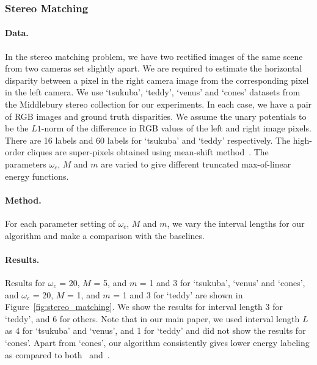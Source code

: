 \documentclass[10pt,letterpaper]{article}
\newcommand{\mysubsubsection}[1]{\vspace{0mm}\subsubsection{#1}\vspace{0mm}}
\newcommand{\myparagraph}[1]{\vspace{0mm}\paragraph{#1}}
\begin{document}
\clearpage

\mysubsubsection{Stereo Matching}

\myparagraph{\bf Data.} In the stereo matching problem, we have two rectified images of the same scene from two cameras set slightly apart. We are required to estimate the horizontal disparity between a pixel in the right camera image from the corresponding pixel in the left camera. We use `tsukuba', `teddy', `venus' and `cones' datasets from the Middlebury stereo collection for our experiments. In each case, we have a pair of RGB images and ground truth disparities. We assume the unary potentials to be the $L1$-norm of the difference in RGB values of the left and right image pixels. There are 16 labels and 60 labels for `tsukuba' and `teddy' respectively. The high-order cliques are super-pixels obtained using mean-shift method~\cite{comaniciu2002mean}. The parameters $\omega_c$, $M$ and $m$ are varied to give different truncated max-of-linear energy functions.


\myparagraph{\bf Method.} For each parameter setting of $\omega_c$, $M$ and $m$, we vary the interval lengths for our algorithm and make a comparison with the baselines.

\myparagraph{\bf Results.} Results for $\omega_c$ = 20, $M$ = 5, and $m$ = 1 and 3 for `tsukuba', `venus' and `cones', and $\omega_c$ = 20, $M$ = 1, and $m$ = 1 and 3 for `teddy' are shown in Figure~\ref{fig:stereo_matching}. We show the results for interval length 3 for `teddy', and 6 for others. Note that in our main paper, we used interval length $L$ as 4 for `tsukuba' and `venus', and 1 for `teddy' and did not show the results for `cones'. Apart from `cones', our algorithm consistently gives lower energy labeling as compared to both~\cite{dokaniaiccv15} and~\cite{ladickyeccv10}. 

\clearpage
{}
\end{document}

